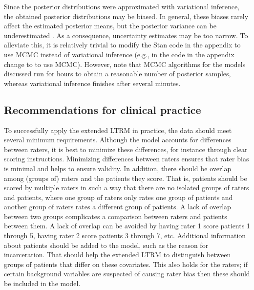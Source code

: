 \documentclass[a4paper,usenames,dvipsnames]{article}
\newcommand{\DON}	[1] 	{}%
\newcommand{\MR}	[1] 	{}%
\begin{document}
Since the posterior distributions were approximated with variational inference, the obtained posterior distributions may be biased. In general, these biases rarely affect the estimated posterior means, but the posterior variance can be underestimated \cite{blei2017variational}. As a consequence, uncertainty estimates may be too narrow. To alleviate this, it is relatively trivial to modify the Stan code in the appendix to use MCMC instead of variational inference (e.g., in the code in the appendix change  to  to use MCMC). However, note that MCMC algorithms for the models discussed run for hours to obtain a reasonable number of posterior samples, whereas variational inference finishes after several minutes.

\subsection*{Recommendations for clinical practice}
To successfully apply the extended LTRM in practice, the data should meet several minimum requirements. %
Although the model accounts for differences between raters, it is best to minimize these differences, for instance through clear scoring instructions.\MR{why?}\DON{see 2nd sentence} Minimizing differences between raters ensures that rater bias is minimal and helps to ensure validity. In addition, there should be overlap among (groups of) raters and the patients they score. That is, patients should be scored by multiple raters in such a way that there are no isolated groups of raters and patients, where one group of raters only rates one group of patients and another group of raters rates a different group of patients. A lack of overlap between two groups complicates a comparison between raters and patients between them. A lack of overlap can be avoided by having rater 1 score patients 1 through 5, having rater 2 score patients 3 through 7, etc. Additional information about patients should be added to the model, such as the reason for incarceration. That should help the extended LTRM to distinguish between groups of patients that differ on these covariates. This also holds for the raters; if certain background variables are suspected of causing rater bias then these should be included in the model.\MR{ok, I get this part. I'm still very unclear on what the patient background info adds if the goal is to produce factor scores, and not to estimate the effect of patient characteristics on those scores, what is added by including them?}
\end{document}
